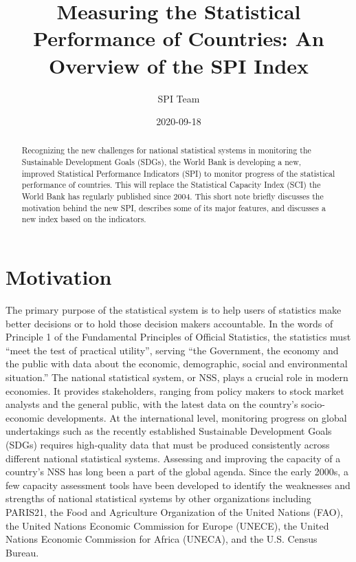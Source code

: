 \documentclass[
]{article}
\title{Measuring the Statistical Performance of Countries: An Overview
of the SPI Index}
\author{SPI Team}
\date{2020-09-18}
\begin{document}
\maketitle
\begin{abstract}
Recognizing the new challenges for national statistical systems in
monitoring the Sustainable Development Goals (SDGs), the World Bank is
developing a new, improved Statistical Performance Indicators (SPI) to
monitor progress of the statistical performance of countries. This will
replace the Statistical Capacity Index (SCI) the World Bank has
regularly published since 2004. This short note briefly discusses the
motivation behind the new SPI, describes some of its major features, and
discusses a new index based on the indicators.
\end{abstract}

\hypertarget{motivation}{%
\section{Motivation}\label{motivation}}

The primary purpose of the statistical system is to help users of
statistics make better decisions or to hold those decision makers
accountable. In the words of Principle 1 of the Fundamental Principles
of Official Statistics, the statistics must ``meet the test of practical
utility'', serving ``the Government, the economy and the public with
data about the economic, demographic, social and environmental
situation.'' The national statistical system, or NSS, plays a crucial
role in modern economies. It provides stakeholders, ranging from policy
makers to stock market analysts and the general public, with the latest
data on the country's socio-economic developments. At the international
level, monitoring progress on global undertakings such as the recently
established Sustainable Development Goals (SDGs) requires high-quality
data that must be produced consistently across different national
statistical systems. Assessing and improving the capacity of a country's
NSS has long been a part of the global agenda. Since the early 2000s, a
few capacity assessment tools have been developed to identify the
weaknesses and strengths of national statistical systems by other
organizations including PARIS21, the Food and Agriculture Organization
of the United Nations (FAO), the United Nations Economic Commission for
Europe (UNECE), the United Nations Economic Commission for Africa
(UNECA), and the U.S. Census Bureau.
\end{document}
